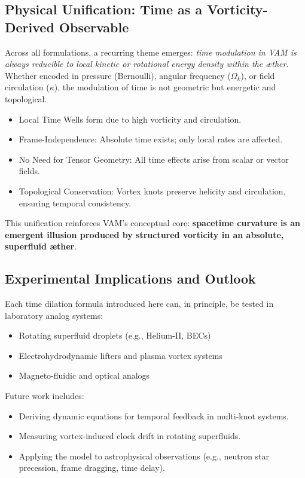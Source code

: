\subsection{Physical Unification: Time as a Vorticity-Derived Observable}

Across all formulations, a recurring theme emerges: \textit{time modulation in VAM is always reducible to local kinetic or rotational energy density within the æther}. Whether encoded in pressure (Bernoulli), angular frequency (\( \Omega_k \)), or field circulation (\( \kappa \)), the modulation of time is not geometric but energetic and topological.

\begin{itemize}
    \item Local Time Wells form due to high vorticity and circulation.
    \item Frame-Independence: Absolute time exists; only local rates are affected.
    \item No Need for Tensor Geometry: All time effects arise from scalar or vector fields.
    \item Topological Conservation: Vortex knots preserve helicity and circulation, ensuring temporal consistency.
\end{itemize}

This unification reinforces VAM’s conceptual core: \textbf{spacetime curvature is an emergent illusion produced by structured vorticity in an absolute, superfluid æther}.

\subsection{Experimental Implications and Outlook}

Each time dilation formula introduced here can, in principle, be tested in laboratory analog systems:
\begin{itemize}
    \item Rotating superfluid droplets (e.g., Helium-II, BECs)
    \item Electrohydrodynamic lifters and plasma vortex systems
    \item Magneto-fluidic and optical analogs
\end{itemize}

Future work includes:
\begin{itemize}
    \item Deriving dynamic equations for temporal feedback in multi-knot systems.
    \item Measuring vortex-induced clock drift in rotating superfluids.
    \item Applying the model to astrophysical observations (e.g., neutron star precession, frame dragging, time delay).
\end{itemize}

